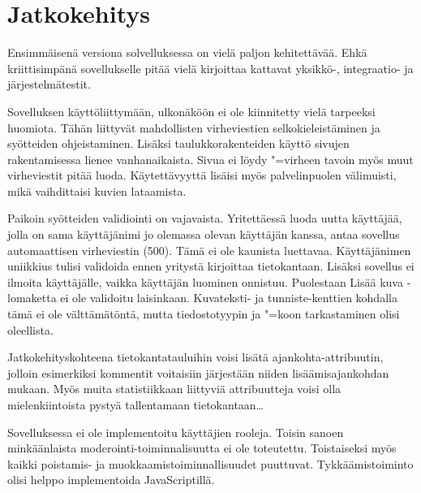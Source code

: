 \documentclass[finnish,colorlinks,headings=normal,parskip=half,footsepline]{scrartcl}
\begin{document}
\section{Jatkokehitys}
Ensimmäisenä versiona solvelluksessa on vielä paljon kehitettävää. Ehkä kriittisimpänä sovellukselle pitää vielä kirjoittaa kattavat yksikkö-, integraatio- ja järjestelmätestit.

Sovelluksen käyttöliittymään, ulkonäköön ei ole kiinnitetty vielä tarpeeksi huomiota. Tähän liittyvät mahdollisten virheviestien selkokieleistäminen ja syötteiden ohjeistaminen. Lisäksi taulukkorakenteiden käyttö sivujen rakentamisessa lienee vanhanaikaista. Sivua ei löydy "=virheen tavoin myös muut virheviestit pitää luoda. Käytettävyyttä lisäisi myös palvelinpuolen välimuisti, mikä vaihdittaisi kuvien lataamista.

Paikoin syötteiden validiointi on vajavaista. Yritettäessä luoda uutta käyttäjää, jolla on sama käyttäjänimi jo olemassa olevan käyttäjän kanssa, antaa sovellus automaattisen virheviestin (500). Tämä ei ole kaunista luettavaa. Käyttäjänimen uniikkius tulisi validoida ennen yritystä kirjoittaa tietokantaan. Lisäksi sovellus ei ilmoita käyttäjälle, vaikka käyttäjän luominen onnistuu. Puolestaan Lisää kuva -lomaketta ei ole validoitu laisinkaan. Kuvateksti- ja tunniste-kenttien kohdalla tämä ei ole välttämätöntä, mutta tiedostotyypin ja "=koon tarkastaminen olisi oleellista.

Jatkokehityskohteena tietokantatauluihin voisi lisätä ajankohta-attribuutin, jolloin esimerkiksi kommentit voitaisiin järjestään niiden lisäämisajankohdan mukaan. Myös muita statistiikkaan liittyviä attribuutteja voisi olla mielenkiintoista pystyä tallentamaan tietokantaan\ldots

Sovelluksessa ei ole implementoitu käyttäjien rooleja. Toisin sanoen minkäänlaista moderointi-toiminnalisuutta ei ole toteutettu. Toistaiseksi myös kaikki poistamis- ja muokkaamistoiminnallisuudet puuttuvat. Tykkäämistoiminto olisi helppo implementoida JavaScriptillä.
\end{document}
